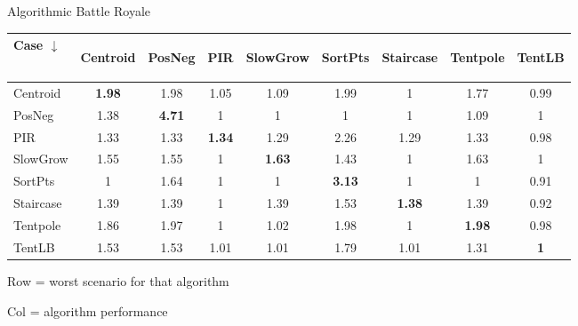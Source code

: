 \documentclass[compress,table]{beamer}
\begin{document}
\begin{frame}[t]{Algorithmic Battle Royale}

\begin{table} \centering
\begin{tabular}{|l|ccccccc|c|}
\hline
Case $\downarrow$
 & \begin{sideways} Centroid \end{sideways}
 & \begin{sideways} PosNeg \end{sideways}
 & \begin{sideways} PIR \end{sideways}
 & \begin{sideways} SlowGrow \end{sideways}
 & \begin{sideways} SortPts \end{sideways}
 & \begin{sideways} Staircase \end{sideways}
 & \begin{sideways} Tentpole \end{sideways}
 & \begin{sideways} TentLB \end{sideways}
 \\ \hline
Centroid & \textbf{1.98} & 1.98 & 1.05 & 1.09 & 1.99 & 1 & 1.77 & 0.99\\ 
PosNeg & 1.38 & \textbf{4.71} & 1 & 1 & 1 & 1 &  1.09 & 1\\ 
PIR & 1.33 & 1.33 & \textbf{1.34} & 1.29 & 2.26 & 1.29 & 1.33 & 0.98\\ 
SlowGrow & 1.55 & 1.55 & 1 & \textbf{1.63} & 1.43 & 1 & 1.63 & 1\\ 
SortPts & 1 & 1.64 & 1 & 1 & \textbf{3.13} & 1 & 1 & 0.91 \\ 
Staircase & 1.39 & 1.39 & 1 & 1.39 & 1.53 & \textbf{1.38} & 1.39 & 0.92\\ 
Tentpole & 1.86 & 1.97 & 1 & 1.02 & 1.98 & 1 &  \textbf{1.98} &0.98\\ \hline
TentLB & 1.53 & 1.53 & 1.01 & 1.01 & 1.79 & 1.01 & 1.31 & \textbf{1}\\ 
\hline 
 \end{tabular}
\end{table}

Row = worst scenario for that algorithm

Col = algorithm performance
\end{frame}
\end{document}
